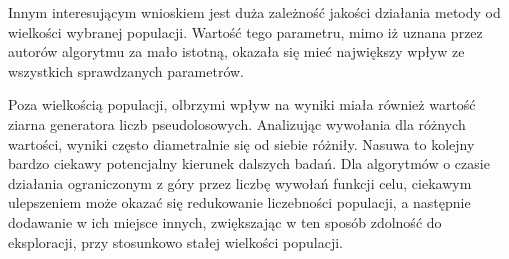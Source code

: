 \documentclass[10pt]{article}
\begin{document}
Innym interesującym wnioskiem jest duża zależność jakości działania metody od wielkości wybranej populacji. Wartość tego parametru, mimo iż uznana przez autorów algorytmu za mało istotną, okazała się mieć największy wpływ ze wszystkich sprawdzanych parametrów. 

Poza wielkością populacji, olbrzymi wpływ na wyniki miała również wartość ziarna generatora liczb pseudolosowych. Analizując wywołania dla różnych wartości, wyniki często diametralnie się od siebie różniły. Nasuwa to kolejny bardzo ciekawy potencjalny kierunek dalszych badań. Dla algorytmów o czasie działania ograniczonym z góry przez liczbę wywołań funkcji celu, ciekawym ulepszeniem może okazać się redukowanie liczebności populacji, a następnie dodawanie w ich miejsce innych, zwiększając w ten sposób zdolność do eksploracji, przy stosunkowo stałej wielkości populacji.

\printbibliography
\end{document}
